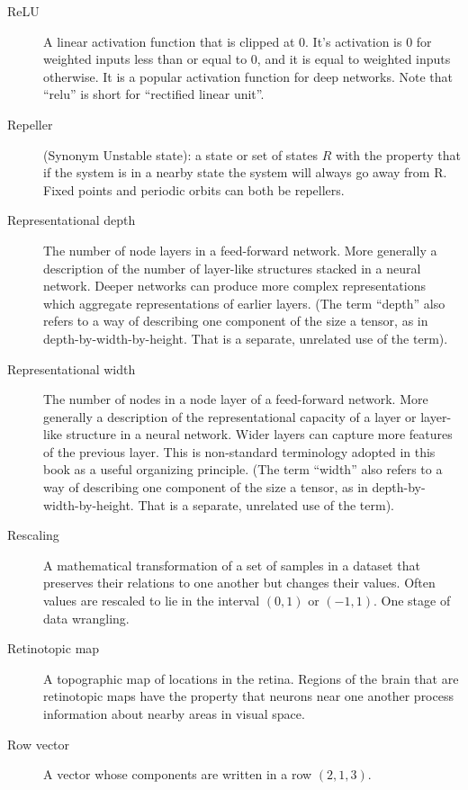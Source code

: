 \begin{description}
\item[ReLU] A linear activation function that is clipped at  0. It's activation is 0 for weighted inputs less than or equal to 0, and it is equal to weighted inputs otherwise. It is a popular activation function for deep networks. Note that ``relu'' is short for ``rectified linear unit''.

\item[Repeller] (Synonym Unstable state): a state or set of states $R$ with the property that if the system is in a nearby state the system will always go away from R. Fixed points and periodic orbits can both be repellers.

\item[Representational depth] The number of node layers in a feed-forward network. More generally a description of the number of  layer-like structures stacked in a neural network. Deeper networks can produce more complex representations which aggregate representations of earlier layers. (The term ``depth'' also refers to a way of describing one component of the size a tensor, as in depth-by-width-by-height. That is a separate, unrelated use of the term).
 
\item[Representational width] The number of nodes in a node layer of a feed-forward network. More generally a description of the representational capacity of a layer or layer-like structure in a neural network. Wider layers can capture more features of the previous layer. This is non-standard terminology adopted in this book as a useful organizing principle. (The term ``width'' also refers to a way of describing one component of the size a tensor, as in depth-by-width-by-height. That is a separate, unrelated use of the term).

\item[Rescaling] A mathematical transformation of a set of samples in a dataset that preserves their relations to one another but changes their values. Often values are rescaled to lie in the interval $(0,1)$ or $(-1,1)$. One stage of data wrangling.


\item[Retinotopic map] A topographic map of locations in the retina. Regions of the brain that are retinotopic maps have the property that neurons near one another process information about nearby areas in visual space.

\item[Row vector] A vector whose components are written in a row \eg $(2,1,3)$.


\end{description}
